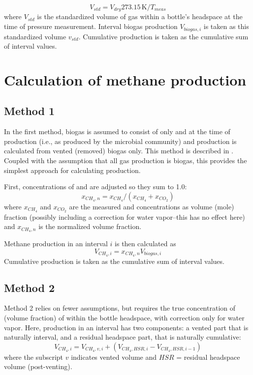 \documentclass[]{article}
\newcommand{\unit}[1]{\ensuremath{\, \mathrm{#1}}}
\begin{document}
\begin{equation}
  \label{eq:bgstd}
  V_{std} = V_{dry} 273.15 \unit{K}/T_{meas}
\end{equation}
where $V_{std}$ is the standardized volume of gas within a bottle's headspace at the time of pressure measurement.
Interval biogas production $V_{biogas, i}$ is taken as this standardized volume $v_{std}$.
Cumulative production is taken as the cumulative sum of interval values. 

\section{Calculation of methane production}
\subsection{Method 1}
In the first method, biogas is assumed to consist of only  and  at the time of production (i.e., as produced by the microbial community) and  production is calculated from vented (removed) biogas only.
This method is described in \cite{richardsMethodsKineticanalysisMethane1991}.
Coupled with the assumption that all gas production is biogas, this provides the simplest approach for calculating  production.

First, concentrations of  and  are adjusted so they sum to 1.0:
\begin{equation}
  x_{CH_4, n} = x_{CH_4}/(x_{CH_4} + x_{CO_2})
\end{equation}
where $x_{CH_4}$ and $x_{CO_2}$ are the measured  and  concentrations as volume (mole) fraction (possibly including a correction for water vapor--this has no effect here) and $x_{CH_4, n}$ is the normalized  volume fraction.

Methane production in an interval $i$ is then calculated as
\begin{equation}
  V_{CH_4, i} = x_{CH_4, n} V_{biogas, i}
\end{equation}
Cumulative production is taken as the cumulative sum of interval values. 

\subsection{Method 2}
Method 2 relies on fewer assumptions, but requires the true concentration of  (volume fraction) of  within the bottle headspace, with correction only for water vapor.
Here,  production in an interval has two components: a vented part that is naturally interval, and a residual headspace part, that is naturally cumulative:
\begin{equation}
  V_{CH_4, i} = V_{CH_4, v, i} + ( V_{CH_4, HSR, i} - V_{CH_4, HSR, i-1} )
\end{equation}
where the subscript $v$ indicates vented volume and $HSR$ = residual headspace volume (post-venting).
\end{document}
